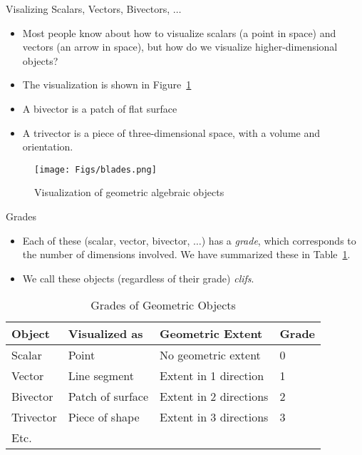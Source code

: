 \documentclass[aspectratio=169,xcolor=dvipsnames]{beamer}
\begin{document}




\begin{frame}{Visalizing Scalars, Vectors, Bivectors, $\ldots$}
\begin{itemize}
\item Most people know about how to visualize scalars (a point in space) and
      vectors (an arrow in space), but how do we visualize higher-dimensional objects?
\item The visualization is shown in Figure~\ref{Fig:ObjViz}
\item A bivector is a patch of flat surface
\item A trivector is a piece of three-dimensional space, with a volume and orientation.
\end{itemize}

\begin{figure}
      \texttt{[image: Figs/blades.png]}
      \caption{Visualization of geometric algebraic objects}\label{Fig:ObjViz}
\end{figure}

\end{frame}



\begin{frame}{Grades}
\begin{itemize}
\item Each of these (scalar, vector, bivector, $\ldots$) has a \textit{grade}, which
      corresponds to the number of dimensions involved. We have summarized these
      in Table~\ref{Tab:Grades}.
\item We call these objects (regardless of their grade) \textit{clifs}.
\end{itemize}

\begin{table}
\caption{Grades of Geometric Objects}\label{Tab:Grades}
\begin{tabularx}{\textwidth}{p{2cm}p{3cm}p{5cm}l}
      \toprule {\bf Object} & {\bf Visualized as} & {\bf Geometric Extent} & \bf Grade\\
      \midrule
      Scalar & Point & No geometric extent & 0 \\
      Vector & Line segment & Extent in 1 direction & 1 \\
      Bivector & Patch of surface & Extent in 2 directions & 2 \\
      Trivector & Piece of shape & Extent in 3 directions & 3 \\
      Etc. & & &\\
      \bottomrule
\end{tabularx}
\end{table}

\end{frame}
\end{document}
